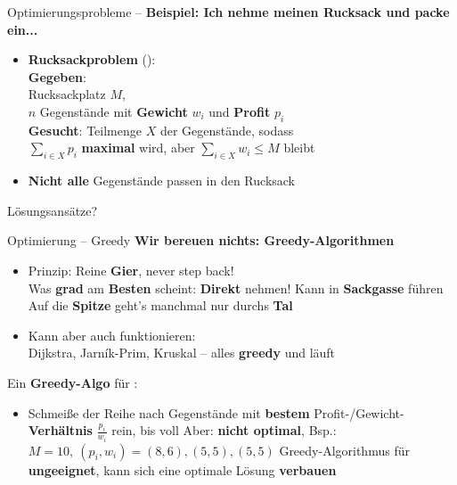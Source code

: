 \begin{frame}{Optimierungsprobleme – \Knapsack}
	\textbf{Beispiel: Ich nehme meinen Rucksack und packe ein...} 
	\begin{itemize}
		\item \textbf{Rucksackproblem} (\Knapsack): \\
		\textbf{Gegeben}: \\ 
		\quad Rucksackplatz $M$, \\
		\quad $n$ Gegenstände mit \textbf{Gewicht} $w_i$ und \textbf{Profit} $p_i$ \\
		\textbf{Gesucht}: Teilmenge $X$ der Gegenstände, sodass \\
		\quad $\sum\limits_{i \in X} p_i$ \textbf{maximal} wird, aber $\sum\limits_{i \in X} w_i \leq M$ bleibt
		\item \textbf{Nicht alle} Gegenstände passen in den Rucksack
	\end{itemize}
	\forcenewline
	\pause
	Lösungsansätze?
\end{frame}

\begin{frame}{Optimierung – Greedy}
	\textbf{Wir bereuen nichts: Greedy-Algorithmen} 
	\begin{itemize}
		\item Prinzip: Reine \textbf{Gier}, never step back! \\
		Was \textbf{grad} am \textbf{Besten} scheint: \textbf{Direkt} nehmen!
		\pause
		\implitem Kann in \textbf{Sackgasse} führen 
		\implitem Auf die \textbf{Spitze} geht's manchmal nur durchs \textbf{Tal}
		\pause
		\item Kann aber auch funktionieren: \\
		Dijkstra, Jarník-Prim, Kruskal – alles \textbf{greedy} und läuft \yop
	\end{itemize}
	\pause
	
	Ein \textbf{Greedy-Algo} für \textbf{\Knapsack}:
	\begin{itemize}
		\item Schmeiße der Reihe nach Gegenstände mit \textbf{bestem} Profit-/Gewicht-\textbf{Verhältnis} $\frac{p_i}{w_i}$ rein, bis voll
		\pause
		\implitem Aber: \textbf{nicht optimal}, Bsp.: \ $M=10, \ (p_i, w_i) = (8, 6), (5, 5), (5, 5)$ \crash
		\implitem Greedy-Algorithmus für \Knapsack \textbf{ungeeignet}, kann sich eine optimale Lösung \textbf{verbauen}\\
	\end{itemize}
\end{frame}

